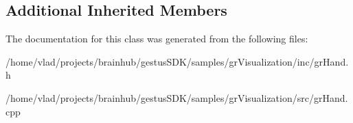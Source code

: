 \subsection*{Additional Inherited Members}


The documentation for this class was generated from the following files\+:\begin{DoxyCompactItemize}
\item 
/home/vlad/projects/brainhub/gestus\+S\+D\+K/samples/gr\+Visualization/inc/gr\+Hand.\+h\item 
/home/vlad/projects/brainhub/gestus\+S\+D\+K/samples/gr\+Visualization/src/gr\+Hand.\+cpp\end{DoxyCompactItemize}
